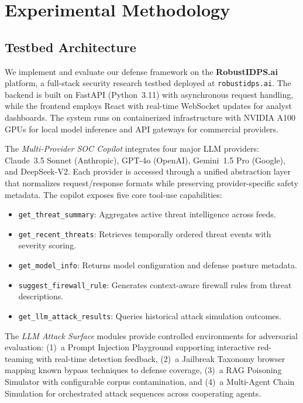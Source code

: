 
\section{Experimental Methodology}\label{sec:methodology}

\subsection{Testbed Architecture}

We implement and evaluate our defense framework on the \textbf{RobustIDPS.ai} platform, a full-stack security research testbed deployed at \texttt{robustidps.ai}. The backend is built on FastAPI (Python~3.11) with asynchronous request handling, while the frontend employs React with real-time WebSocket updates for analyst dashboards. The system runs on containerized infrastructure with NVIDIA A100 GPUs for local model inference and API gateways for commercial providers.

The \emph{Multi-Provider SOC Copilot} integrates four major LLM providers: Claude~3.5 Sonnet (Anthropic), GPT-4o (OpenAI), Gemini~1.5 Pro (Google), and DeepSeek-V2. Each provider is accessed through a unified abstraction layer that normalizes request/response formats while preserving provider-specific safety metadata. The copilot exposes five core tool-use capabilities:
\begin{itemize}
    \item \texttt{get\_threat\_summary}: Aggregates active threat intelligence across feeds.
    \item \texttt{get\_recent\_threats}: Retrieves temporally ordered threat events with severity scoring.
    \item \texttt{get\_model\_info}: Returns model configuration and defense posture metadata.
    \item \texttt{suggest\_firewall\_rule}: Generates context-aware firewall rules from threat descriptions.
    \item \texttt{get\_llm\_attack\_results}: Queries historical attack simulation outcomes.
\end{itemize}

The \emph{LLM Attack Surface} modules provide controlled environments for adversarial evaluation: (1)~a Prompt Injection Playground supporting interactive red-teaming with real-time detection feedback, (2)~a Jailbreak Taxonomy browser mapping known bypass techniques to defense coverage, (3)~a RAG Poisoning Simulator with configurable corpus contamination, and (4)~a Multi-Agent Chain Simulation for orchestrated attack sequences across cooperating agents.

